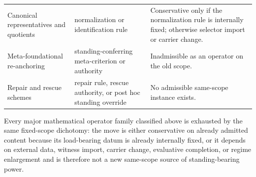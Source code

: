 \begin{center}
\begin{tabularx}{0.98\textwidth}{P{0.23\textwidth}P{0.31\textwidth}Y}
Canonical representatives and quotients & normalization or identification rule & Conservative only if the normalization rule is internally fixed; otherwise selector import or carrier change. \\
Meta-foundational re-anchoring & standing-conferring meta-criterion or authority & Inadmissible as an operator on the old scope. \\
Repair and rescue schemes & repair rule, rescue authority, or post hoc standing override & No admissible same-scope instance exists. \\
\bottomrule
\end{tabularx}
\end{center}

\begin{theorem}
\label{thm:flagship-family-closure}
Every major mathematical operator family classified above is exhausted by the same fixed-scope dichotomy: the move is either conservative on already admitted content because its load-bearing datum is already internally fixed, or it depends on external data, witness import, carrier change, evaluative completion, or regime enlargement and is therefore not a new same-scope source of standing-bearing power.
\end{theorem}

